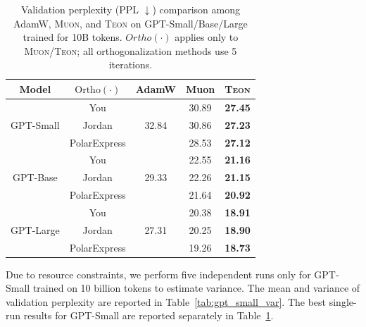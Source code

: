 \documentclass{article}
\theoremstyle{plain}
\theoremstyle{definition}
\theoremstyle{remark}
\begin{document}
\begin{table}[t]
\centering
\footnotesize
\setlength{\tabcolsep}{5pt}
\begin{tabular}{c c c c c}
\toprule
\textbf{Model} & $\mathrm{Ortho}(\cdot)$ & \textbf{AdamW} & \textbf{Muon} & \textbf{\textsc{Teon}} \\
\midrule
\multirow{3}{*}{GPT-Small}
& You          &     & 30.89 & \textbf{27.45} \\
& Jordan       & \multicolumn{1}{c}{32.84} & 30.86 & \textbf{27.23} \\
& PolarExpress & \multicolumn{1}{c}{} & 28.53 & \textbf{27.12} \\
\midrule
\multirow{3}{*}{GPT-Base}
& You          &     & 22.55 & \textbf{21.16} \\
& Jordan       & \multicolumn{1}{c}{29.33} & 22.26 & \textbf{21.15} \\
& PolarExpress & \multicolumn{1}{c}{} & 21.64 & \textbf{20.92} \\
\midrule
\multirow{3}{*}{GPT-Large}
& You          &     & 20.38 & \textbf{18.91} \\
& Jordan       & \multicolumn{1}{c}{27.31} & 20.25 & \textbf{18.90} \\
& PolarExpress & \multicolumn{1}{c}{} & 19.26 & \textbf{18.73} \\
\bottomrule
\end{tabular}
\caption{\footnotesize Validation perplexity (PPL $\downarrow$) comparison among AdamW, \textsc{Muon}, and \textsc{Teon} on GPT-Small/Base/Large trained for 10B tokens. $Ortho(\cdot)$ applies only to \textsc{Muon}/\textsc{Teon}; all orthogonalization methods use 5 iterations.}
\label{tab:gpt2_muon_vs_teon_10b_ppl}
\vspace{-10pt}
\end{table}

Due to resource constraints, we perform five independent runs only for GPT-Small trained on 10 billion tokens to estimate variance. The mean and variance of validation perplexity are reported in Table~\ref{tab:gpt_small_var}. The best single-run results for GPT-Small are reported separately in Table~\ref{tab:gpt2_muon_vs_teon_10b_ppl}.
\end{document}
